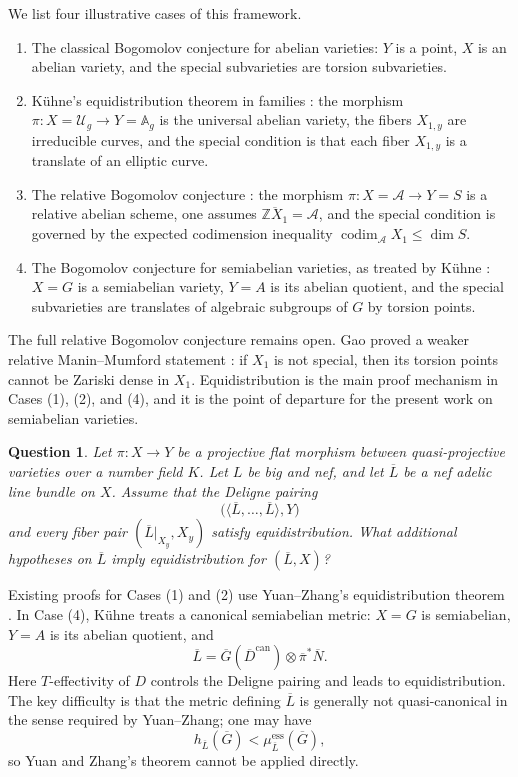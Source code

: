 \documentclass[10pt,a4paper]{amsart}
\theoremstyle{plain}
\theoremstyle{plain}
\newtheorem{ques}[thm]{Question} \newtheorem{prop}[thm]{Proposition}
\numberwithin{equation}{section}
\begin{document}
We list four illustrative cases of this framework.
\begin{enumerate}[label=\textup{(\arabic*)},leftmargin=2em]
	\item The classical Bogomolov conjecture for abelian varieties: \(Y\) is a
	point, \(X\) is an abelian variety, and the special subvarieties are torsion
	subvarieties.
	\item K\"uhne's equidistribution theorem in families \cite{Ku4}: the morphism
	\(\pi:X=\mathscr U_g\to Y=\mathbb A_g\) is the universal abelian variety, the
	fibers \(X_{1,y}\) are irreducible curves, and the special condition is that
	each fiber \(X_{1,y}\) is a translate of an elliptic curve.
	\item The relative Bogomolov conjecture \cite{DGH2}: the morphism
	\(\pi:X=\mathcal A\to Y=S\) is a relative abelian scheme, one assumes
	\(\overline{\mathbb Z X_1}=\mathcal A\), and the special condition is governed
	by the expected codimension inequality
	\(\operatorname{codim}_{\mathcal A}X_1\leq\dim S\).
	\item The Bogomolov conjecture for semiabelian varieties, as treated by
	K\"uhne \cite{Ku1}: \(X=G\) is a semiabelian variety, \(Y=A\) is its abelian
	quotient, and the special subvarieties are translates of algebraic subgroups
	of \(G\) by torsion points.
\end{enumerate}


The full relative Bogomolov conjecture remains open.  Gao proved a weaker
relative Manin--Mumford statement \cite{Gao}: if \(X_1\) is not special, then
its torsion points cannot be Zariski dense in \(X_1\).  Equidistribution is the
main proof mechanism in Cases (1), (2), and (4), and it is the point of
departure for the present work on semiabelian varieties.


\begin{ques}
	Let \(\pi:X\to Y\) be a projective flat morphism between quasi-projective
	varieties over a number field \(K\).  Let \(L\) be big and nef, and let
	\(\overline L\) be a nef adelic line bundle on \(X\).  Assume that the
	Deligne pairing
	\[
	\bigl(\langle\overline L,\ldots,\overline L\rangle,Y\bigr)
	\]
	and every fiber pair \((\overline L|_{X_y},X_y)\) satisfy equidistribution.
	What additional hypotheses on \(\overline L\) imply equidistribution for
	\((\overline L,X)\)?
\end{ques}


Existing proofs for Cases (1) and (2) use Yuan--Zhang's equidistribution
theorem \cite{YZ}.  In Case (4), K\"uhne \cite{Ku1} treats a canonical
semiabelian metric: \(X=G\) is semiabelian, \(Y=A\) is its abelian quotient,
and
\[
\overline{L}
=
\overline{G}(\overline{D}^{\mathrm{can}})
\otimes \overline{\pi}^{*}\overline N .
\]
Here \(T\)-effectivity of \(D\) controls the Deligne pairing and leads to
equidistribution.  The key difficulty is that the metric defining
\(\overline L\) is generally not quasi-canonical in the sense required by
Yuan--Zhang; one may have
\[
h_{\overline{L}}(\overline G)<\mu^{\mathrm{ess}}_{\overline{L}}(\overline G),
\]
so Yuan and Zhang's theorem cannot be applied directly.
\end{document}

